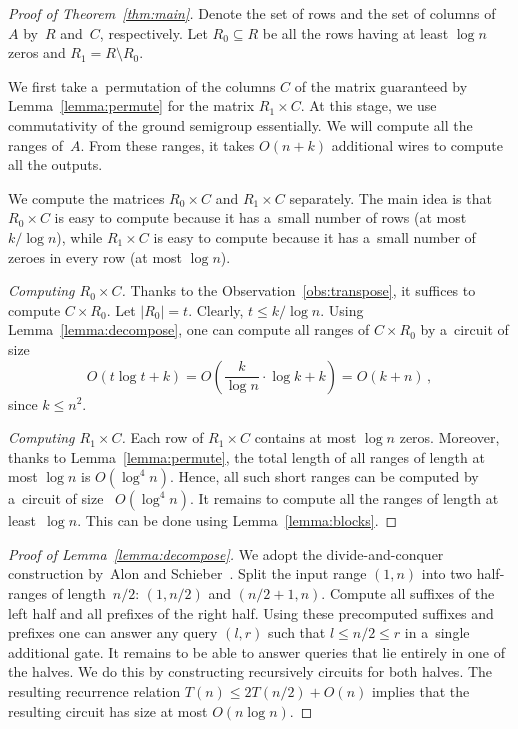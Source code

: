 \documentclass[11pt,letterpaper]{article}
\begin{document}
\begin{proof}[Proof of Theorem~\ref{thm:main}]
Denote the set of rows and the set of columns of~$A$ by~$R$
and~$C$, respectively. Let $R_0 \subseteq R$ be all the rows
having at least $\log n$ zeros and $R_1=R \setminus R_0$.

We first take a~permutation of the columns $C$ of the matrix
guaranteed by Lemma~\ref{lemma:permute} for the matrix $R_1 \times C$. At this stage,
we use commutativity of the ground semigroup essentially.
We will compute all the ranges of~$A$. From these ranges,
it takes $O(n+k)$ additional wires to compute all the outputs.

We
compute the matrices $R_0 \times C$ and $R_1 \times C$
separately. The main idea is that $R_0 \times C$ is easy to compute
because it has a~small number of rows (at most $k/\log n$), while $R_1 \times C$
is easy to compute because it has a~small number of zeroes in every row (at most
$\log n$).

\emph{Computing $R_0 \times C$.} Thanks to the Observation~\ref{obs:transpose},
it suffices to compute $C \times R_0$.
Let $|R_0|=t$. Clearly, $t \le k/\log n$.
Using Lemma~\ref{lemma:decompose}, one can compute all
ranges of $C \times R_0$ by a~circuit of size
\[O(t\log t+k)=O\left(\frac{k}{\log n} \cdot \log k+k\right)=O(k+n)\, ,\]
since $k \le n^2$.

\emph{Computing $R_1 \times C$.} Each row of
$R_1 \times C$ contains at most $\log n$ zeros. Moreover,
thanks to Lemma~\ref{lemma:permute}, the total length of all
ranges of length at most $\log n$ is $O(\log^4n)$. Hence, all
such short ranges can be computed by a~circuit of size~
$O(\log^4n)$. It remains to compute all the ranges of
length at least~$\log n$. This can be done using Lemma~\ref{lemma:blocks}.
\end{proof}

\begin{proof}[Proof of Lemma~\ref{lemma:decompose}]
We adopt the divide-and-conquer construction by~Alon and Schieber~\cite{Alon87optimalpreprocessing}.
Split the input range $(1,n)$ into two half-ranges of
length~$n/2$:
$(1,n/2)$ and $(n/2+1,n)$.
Compute all suffixes of the left half and all prefixes of
the right half.
Using these precomputed suffixes and
prefixes one can answer any query $(l,r)$ such that $l \le n/2
\le r$ in a~single additional gate. It remains to be able to answer
queries that lie entirely in one of the halves. We do this by
constructing recursively circuits for both halves. The resulting
recurrence relation $T(n) \le 2T(n/2)+O(n)$ implies that the
resulting circuit has size at most $O(n\log n)$.
\end{proof}
\end{document}
